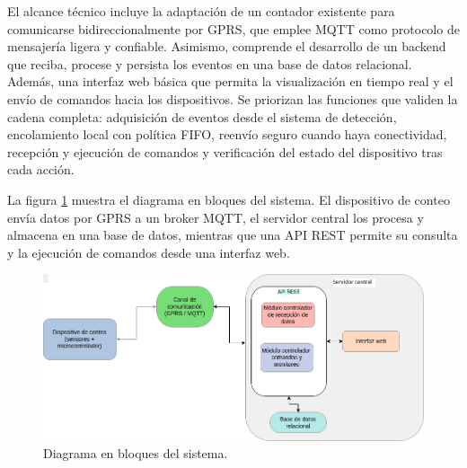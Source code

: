 El alcance técnico incluye la adaptación de un contador existente para comunicarse bidireccionalmente por GPRS, que emplee MQTT como protocolo de mensajería ligera y confiable. Asimismo, comprende el desarrollo de un backend que reciba, procese y persista los eventos en una base de datos relacional. Además, una interfaz web básica que permita la visualización en tiempo real y el envío de comandos hacia los dispositivos. Se priorizan las funciones que validen la cadena completa: adquisición de eventos desde el sistema de detección, encolamiento local con política FIFO, reenvío seguro cuando haya conectividad, recepción y ejecución de comandos y verificación del estado del dispositivo tras cada acción. 


La figura \ref{fig:diag_bloques} muestra el diagrama en bloques del sistema. 
El dispositivo de conteo envía datos por GPRS a un broker MQTT, el servidor central 
los procesa y almacena en una base de datos, mientras que una API REST permite su 
consulta y la ejecución de comandos desde una interfaz web.



\begin{figure}[htbp]
  \centering
  \includegraphics[width=\linewidth]{./Figures/diagBloques.png}
  \caption{Diagrama en bloques del sistema.}
  \label{fig:diag_bloques}
\end{figure}












